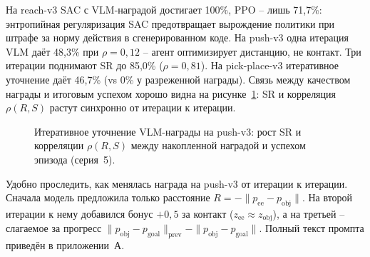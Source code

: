     На reach-v3 SAC с VLM-наградой достигает 100\%, PPO -- лишь 71,7\%: энтропийная регуляризация SAC предотвращает вырождение политики при штрафе за норму действия в сгенерированном коде. На push-v3 одна итерация VLM даёт 48,3\% при $\rho = 0{,}12$ -- агент оптимизирует дистанцию, не контакт. Три итерации поднимают SR до 85,0\% ($\rho = 0{,}81$). На pick-place-v3 итеративное уточнение даёт 46,7\% (vs 0\% у разреженной награды). Связь между качеством награды и итоговым успехом хорошо видна на рисунке~\ref{fig:vlm_iter}: SR и корреляция $\rho(R,S)$ растут синхронно от итерации к итерации.

\begin{figure}[htbp]
    \centering
    \caption{Итеративное уточнение VLM-награды на push-v3: рост SR и корреляции $\rho(R,S)$ между накопленной наградой и успехом эпизода (серия~5).}
    \label{fig:vlm_iter}
\end{figure}

    Удобно проследить, как менялась награда на push-v3 от итерации к итерации. Сначала модель предложила только расстояние $R = -\|p_{\text{ee}} - p_{\text{obj}}\|$. На второй итерации к нему добавился бонус $+0{,}5$ за контакт ($z_{\text{ee}} \approx z_{\text{obj}}$), а на третьей -- слагаемое за прогресс $\|p_{\text{obj}} - p_{\text{goal}}\|_{\text{prev}} - \|p_{\text{obj}} - p_{\text{goal}}\|$. Полный текст промпта приведён в приложении~А.

